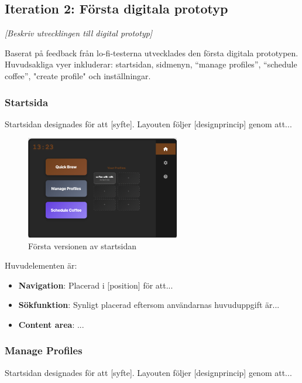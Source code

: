 \subsection{Iteration 2: Första digitala prototyp}

\textit{[Beskriv utvecklingen till digital prototyp]}

Baserat på feedback från lo-fi-testerna utvecklades den första digitala prototypen. Huvudsakliga vyer inkluderar: startsidan, sidmenyn, “manage profiles”, “schedule coffee”, "create profile" och inställningar. 

\subsubsection{Startsida}

Startsidan designades för att [syfte]. Layouten följer [designprincip] genom att...

\begin{figure}[H]
    \centering
    \includegraphics[width=0.6\textwidth]{bilder/start.png}
    \caption{Första versionen av startsidan}
    \label{fig:startsida_v1}
\end{figure}

Huvudelementen är:
\begin{itemize}
    \item \textbf{Navigation}: Placerad i [position] för att...
    \item \textbf{Sökfunktion}: Synligt placerad eftersom användarnas huvuduppgift är...
    \item \textbf{Content area}: ...
\end{itemize}


\subsubsection{Manage Profiles}

Startsidan designades för att [syfte]. Layouten följer [designprincip] genom att...


